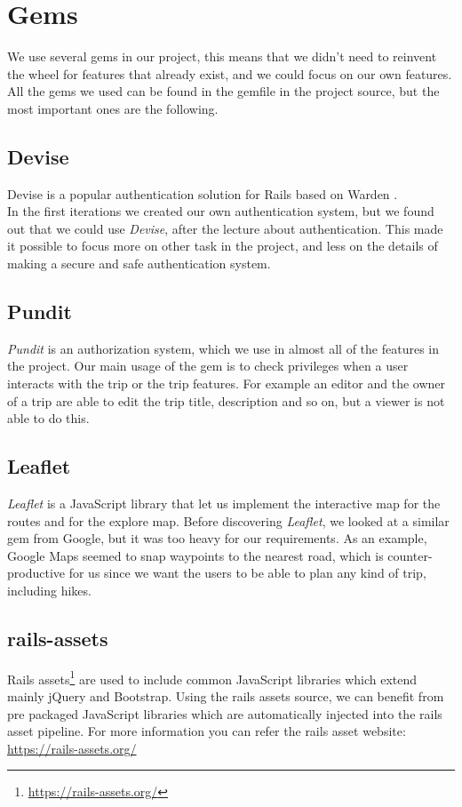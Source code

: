 \documentclass[a4paper]{article}
\begin{document}
\section{Gems}
We use several gems in our project, this means that we didn't need to reinvent the wheel for features that already exist, and we could focus on our own features. All the gems we used can be found in the gemfile in the project source, but the most important ones are the following.
\subsection{Devise}
Devise is a popular authentication solution for Rails based on Warden \cite{devise}. \\
In the first iterations we created our own authentication system, but we found out that we could use \textit{Devise}, after the lecture about authentication. This made it possible to focus more on other task in the project, and less on the details of making a secure and safe authentication system. 

\subsection{Pundit}
\textit{Pundit} is an authorization system\cite{pundit}, which we use in almost all of the features in the project. Our main usage of the gem is to check privileges when a user interacts with the trip or the trip features. For example an editor and the owner of a trip are able to edit the trip title, description and so on, but a viewer is not able to do this. 

\subsection{Leaflet}
\textit{Leaflet}\cite{leaflet} is a JavaScript library that let us implement the interactive map for the routes and for the explore map. Before discovering \textit{Leaflet}, we looked at a similar gem from Google, but it was too heavy for our requirements. As an example, Google Maps seemed to snap waypoints to the nearest road, which is counter-productive for us since we want the users to be able to plan any kind of trip, including hikes.

\subsection{rails-assets}
Rails assets\footnote{\url{https://rails-assets.org/}} are used to include common JavaScript libraries which extend mainly jQuery and Bootstrap. Using the rails assets source, we can benefit from pre packaged JavaScript libraries which are automatically injected into the rails asset pipeline. For more information you can refer the rails asset website: \url{https://rails-assets.org/}
\end{document}
